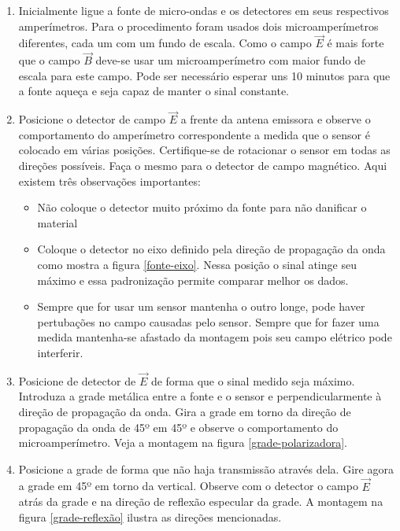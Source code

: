 \documentclass[a4paper,11pt]{article}
\begin{document}
\begin{enumerate}

	\item Inicialmente ligue a fonte de micro-ondas e os detectores em seus respectivos amperímetros. Para o procedimento foram usados dois microamperímetros diferentes, cada um com um fundo de escala. Como o campo $ \vec{E} $ é mais forte que o campo $ \vec{B} $ deve-se usar um microamperímetro com maior fundo de escala para este campo. Pode ser necessário esperar uns 10 minutos para que a fonte aqueça e seja capaz de manter o sinal constante.
	
	\item Posicione o detector de campo $ \vec{E} $ a frente da antena emissora e observe o comportamento do amperímetro correspondente a medida que o sensor é colocado em várias posições. Certifique-se de rotacionar o sensor em todas as direções possíveis. Faça o mesmo para o detector de campo magnético. Aqui existem três observações importantes: 
			\begin{itemize}
				\item Não coloque o detector muito próximo da fonte para não danificar o material
				\item Coloque o detector no eixo definido pela direção de propagação da onda como mostra a figura \ref{fonte-eixo}. Nessa posição o sinal atinge seu máximo e essa padronização permite comparar melhor os dados.
			
				\item Sempre que for usar um sensor mantenha o outro longe, pode haver pertubações no campo causadas pelo sensor. Sempre que for fazer uma medida mantenha-se afastado da montagem pois seu campo elétrico pode interferir.
			\end{itemize}	
	
	\item Posicione de detector de $ \vec{E} $ de forma que o sinal medido seja máximo. Introduza a grade metálica entre a fonte e o sensor e perpendicularmente à direção de propagação da onda. Gira a grade em torno da direção de propagação da onda de 45º em 45º e observe o comportamento do microamperímetro. Veja a montagem na figura \ref{grade-polarizadora}.  

	\item Posicione a grade de forma que não haja transmissão através dela. Gire agora a grade em 45º em torno da vertical. Observe com o detector o campo $ \vec{E} $ atrás da grade e na direção de reflexão especular da grade. A montagem na figura \ref{grade-reflexão} ilustra as direções mencionadas.  


\end{enumerate}
\end{document}
